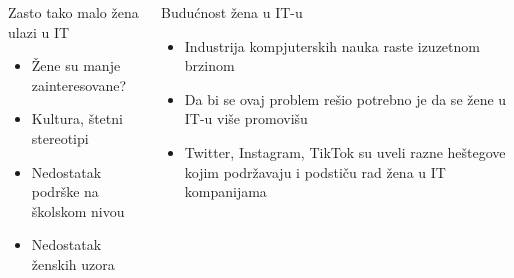 \documentclass[aspectratio=169]{beamer}
\begin{document}
{
\begin{frame}
  
    \begin{columns}
        \begin{block}{Zasto tako malo žena ulazi u IT}
            \begin{itemize}
            \item<1-> Žene su manje zainteresovane?
            \item<2-> Kultura, štetni stereotipi
            \item<3-> Nedostatak podrške na školskom nivou 
            \item<4-> Nedostatak ženskih uzora
            \end{itemize}
        \end{block}  

        \begin{block}{Budućnost žena u IT-u}
            \begin{itemize}
                \item<5-> Industrija kompjuterskih nauka raste izuzetnom brzinom

                \item<6-> Da bi se ovaj problem rešio potrebno je da se žene u IT-u više promovišu

                \item<7-> Twitter, Instagram, TikTok su uveli razne heštegove kojim podržavaju i podstiču rad žena u IT kompanijama 
            \end{itemize}
        \end{block}        
    \end{columns}
   
\end{frame}
}
\end{document}
